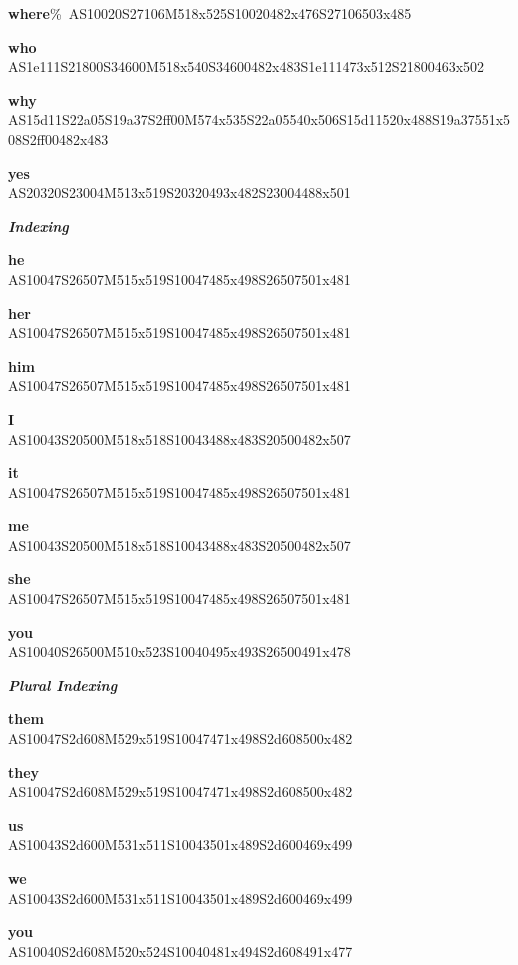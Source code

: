 \documentclass{article}
\begin{document}
\begin{glossary}
\textbf{where}\%\
AS10020S27106M518x525S10020482x476S27106503x485

\textbf{who}\\
AS1e111S21800S34600M518x540S34600482x483S1e111473x512S21800463x502

\textbf{why}\\
AS15d11S22a05S19a37S2ff00M574x535S22a05540x506S15d11520x488S19a37551x508S2ff00482x483

\textbf{yes}\\
AS20320S23004M513x519S20320493x482S23004488x501

\textbf{\emph{Indexing}}

\textbf{he}\\
AS10047S26507M515x519S10047485x498S26507501x481

\textbf{her}\\
AS10047S26507M515x519S10047485x498S26507501x481

\textbf{him}\\
AS10047S26507M515x519S10047485x498S26507501x481

\textbf{I}\\
AS10043S20500M518x518S10043488x483S20500482x507

\textbf{it}\\
AS10047S26507M515x519S10047485x498S26507501x481

\textbf{me}\\
AS10043S20500M518x518S10043488x483S20500482x507

\textbf{she}\\
AS10047S26507M515x519S10047485x498S26507501x481

\textbf{you}\\
AS10040S26500M510x523S10040495x493S26500491x478

\textbf{\emph{Plural Indexing}}

\textbf{them}\\
AS10047S2d608M529x519S10047471x498S2d608500x482

\textbf{they}\\
AS10047S2d608M529x519S10047471x498S2d608500x482

\textbf{us}\\
AS10043S2d600M531x511S10043501x489S2d600469x499

\textbf{we}\\
AS10043S2d600M531x511S10043501x489S2d600469x499

\textbf{you}\\
AS10040S2d608M520x524S10040481x494S2d608491x477


\end{glossary}
\end{document}
